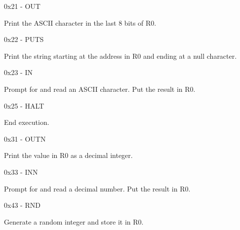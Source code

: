 \begin{DoxyItemize}
\begin{DoxyItemize}
\begin{DoxyItemize}
\begin{DoxyItemize}
\item 0x21 -\/ OUT 
\begin{DoxyItemize}
\item Print the ASCII character in the last 8 bits of R0.
\end{DoxyItemize}
\item 0x22 -\/ PUTS 
\begin{DoxyItemize}
\item Print the string starting at the address in R0 and ending at a null character.
\end{DoxyItemize}
\item 0x23 -\/ IN 
\begin{DoxyItemize}
\item Prompt for and read an ASCII character. Put the result in R0.
\end{DoxyItemize}
\item 0x25 -\/ HALT 
\begin{DoxyItemize}
\item End execution.
\end{DoxyItemize}
\item 0x31 -\/ OUTN 
\begin{DoxyItemize}
\item Print the value in R0 as a decimal integer.
\end{DoxyItemize}
\item 0x33 -\/ INN 
\begin{DoxyItemize}
\item Prompt for and read a decimal number. Put the result in R0.
\end{DoxyItemize}
\item 0x43 -\/ RND 
\begin{DoxyItemize}
\item Generate a random integer and store it in R0.
\end{DoxyItemize}
\end{DoxyItemize}
\end{DoxyItemize}
\end{DoxyItemize}\end{DoxyItemize}
